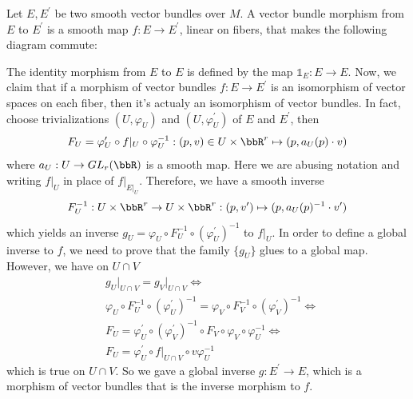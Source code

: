 Let $E,E^\prime$ be two smooth vector bundles over $M$. A vector bundle morphism from $E$ to $E^\prime$ is a smooth map 
$f:E\to E^\prime$, linear on fibers, that makes the following diagram commute:
\begin{center}
\end{center}
The identity morphism from $E$ to $E$ is defined by the map $\mathds{1}_E:E\to E$. Now, we claim that if a morphism of 
vector bundles $f:E\to E^\prime$ is an isomorphism of vector spaces on each fiber, then it's actualy an isomorphism of 
vector bundles. In fact, choose trivializations $(U,\varphi_U)$ and $(U,\varphi_U^\prime)$ of $E$ and $E^\prime$, then 
\begin{equation}
F_U= \varphi_U^\prime\circ f|_U\circ \varphi_U^{-1}:(p,v)\in U\times\bbR^r\mapsto (p,a_U(p)\cdot v)    
\end{equation} 
where $a_U: U\to GL_r(\bbR)$ is a smooth map. Here we are abusing notation and writing $f|_{U}$ in place of $f|_{E|_U}$. 
Therefore, we have a smooth inverse 
\begin{equation}
    F_U^{-1}:U\times\bbR^r\to U\times\bbR^r:(p,v^\prime)\mapsto (p,a_U(p)^{-1}\cdot v^\prime)
\end{equation}
which yields an inverse $g_U=\varphi_U\circ F_U^{-1}\circ (\varphi_U^\prime)^{-1}$ to $f|_U$. In order to define a global 
inverse to $f$, we need to prove that the family $\{g_U\}$ glues to a global map. However, we have on $U\cap V$
\begin{equation}
    \begin{split}
        &g_U\big|_{U\cap V}= g_V\big|_{U\cap V}\iff\\
        &\varphi_U\circ F_U^{-1}\circ (\varphi_U^\prime)^{-1}= \varphi_V\circ F_V^{-1}\circ(\varphi_V^\prime)^{-1}\iff\\
        &F_U = \varphi_U^\prime\circ(\varphi_V^\prime)^{-1}\circ F_V\circ \varphi_V\circ\varphi_U^{-1}\iff \\
        &F_U=\varphi_U^\prime\circ f\big|_{U\cap V}\circ v\varphi_U^{-1}
    \end{split}
\end{equation}
which is true on $U\cap V$. So we gave a global inverse $g:E^\prime\to E$, which is a morphism of vector bundles that 
is the inverse morphism to $f$.\par 

